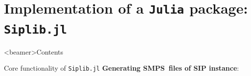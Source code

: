 \documentclass{beamer}
\newcommand{\smps}{\textsf{SMPS}}
\newcommand{\structjump}{\textsf{StructJuMP}}
\newcommand{\siplibjl}{\texttt{Siplib.jl}}
\begin{document}
%		
%		
%		
%		
%		
%		
%		


	\section{Implementation of a \texttt{Julia} package: \textbf{\texttt{Siplib.jl}}}
	\begin{frame}<beamer>{Contents}
	\end{frame}	

	\begin{frame}{Core functionality of \siplibjl}
		\textbf{Generating \smps\ files of SIP instance}:
		\pause
		\begin{figure}
			\begin{center}
			\end{center}
		\end{figure}	
	\end{frame}
\end{document}
